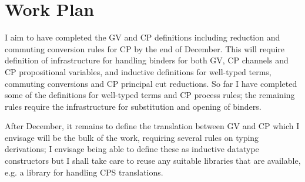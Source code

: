 \documentclass{mprop}
\begin{document}
\section{Work Plan}

I aim to have completed the GV and CP definitions including reduction and commuting conversion rules for CP by the end of December. This will require definition of infrastructure for handling binders for both GV, CP channels and CP propositional variables, and inductive definitions for well-typed terms, commuting conversions and CP principal cut reductions. So far I have completed some of the definitions for well-typed terms and CP process rules; the remaining rules require the infrastructure for substitution and opening of binders.

After December, it remains to define the translation between GV and CP which I envisage will be the bulk of the work, requiring several rules on typing derivations; I envisage being able to define these as inductive datatype constructors but I shall take care to reuse any suitable libraries that are available, e.g. a library for handling CPS translations.


\printbibliography
\end{document}
